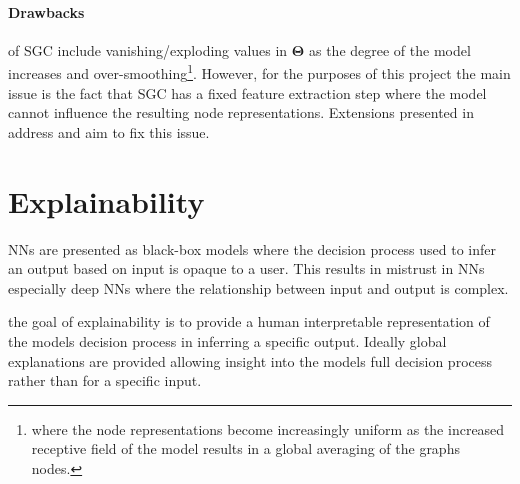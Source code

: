 \paragraph{Drawbacks}
of SGC include vanishing/exploding values in $\bm{\Theta}$ as the degree of the model increases and over-smoothing\footnote{where the node representations become increasingly uniform as the increased receptive field of the model results in a global averaging of the graphs nodes.}.
However, for the purposes of this project the main issue is the fact that SGC has a fixed feature extraction step where the model cannot influence the resulting node representations.
Extensions presented in  address and aim to fix this issue.




\section{Explainability}




NNs are presented as black-box models where the decision process used to infer an output based on input is opaque to a user.
This results in mistrust in NNs especially deep NNs where the relationship between input and output is complex.

the goal of explainability is to provide a human interpretable representation of the models decision process in inferring a specific output.
Ideally global explanations are provided allowing insight into the models full decision process rather than for a specific input.

